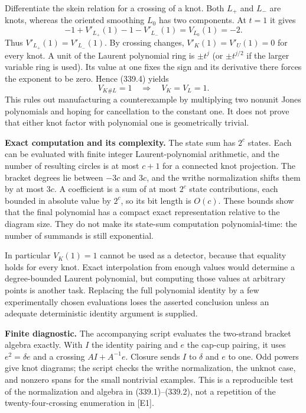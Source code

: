\documentclass[11pt]{article}
\begin{document}
Differentiate the skein relation for a crossing of a knot. Both $L_+$ and $L_-$ are knots, whereas the oriented smoothing $L_0$ has two components. At $t=1$ it gives
\[
 -1+V'_{L_+}(1)-1-V'_{L_-}(1)=V_{L_0}(1)=-2.
\]
Thus $V'_{L_+}(1)=V'_{L_-}(1)$. By crossing changes, $V'_K(1)=V'_U(1)=0$ for every knot. A unit of the Laurent polynomial ring is $\pm t^j$ (or $\pm t^{j/2}$ if the larger variable ring is used). Its value at one fixes the sign and its derivative there forces the exponent to be zero. Hence (339.4) yields
\[
 V_{K\#L}=1\quad\Longrightarrow\quad V_K=V_L=1.
 \tag{339.5}
\]
This rules out manufacturing a counterexample by multiplying two nonunit Jones polynomials and hoping for cancellation to the constant one. It does not prove that either knot factor with polynomial one is geometrically trivial.

\textbf{Exact computation and its complexity.} The state sum has $2^c$ states. Each can be evaluated with finite integer Laurent-polynomial arithmetic, and the number of resulting circles is at most $c+1$ for a connected knot projection. The bracket degrees lie between $-3c$ and $3c$, and the writhe normalization shifts them by at most $3c$. A coefficient is a sum of at most $2^c$ state contributions, each bounded in absolute value by $2^c$, so its bit length is $O(c)$. These bounds show that the final polynomial has a compact exact representation relative to the diagram size. They do not make its state-sum computation polynomial-time: the number of summands is still exponential.

In particular $V_K(1)=1$ cannot be used as a detector, because that equality holds for every knot. Exact interpolation from enough values would determine a degree-bounded Laurent polynomial, but computing those values at arbitrary points is another task. Replacing the full polynomial identity by a few experimentally chosen evaluations loses the asserted conclusion unless an adequate deterministic identity argument is supplied.

\textbf{Finite diagnostic.} The accompanying script evaluates the two-strand bracket algebra exactly. With $I$ the identity pairing and $e$ the cap-cup pairing, it uses $e^2=\delta e$ and a crossing $A I+A^{-1}e$. Closure sends $I$ to $\delta$ and $e$ to one. Odd powers give knot diagrams; the script checks the writhe normalization, the unknot case, and nonzero spans for the small nontrivial examples. This is a reproducible test of the normalization and algebra in (339.1)--(339.2), not a repetition of the twenty-four-crossing enumeration in [E1].
\end{document}
